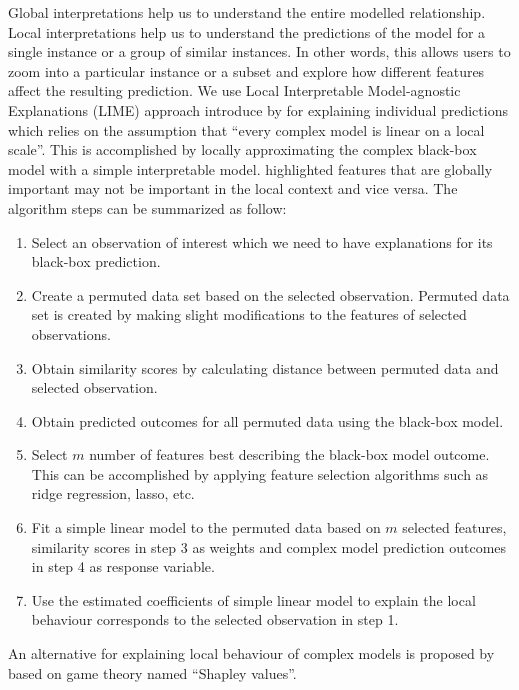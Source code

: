 \documentclass[11pt,a4paper,]{article}
\providecommand{\tightlist}{%
  \setlength{\itemsep}{0pt}\setlength{\parskip}{0pt}}
\begin{document}
Global interpretations help us to understand the entire modelled relationship. Local interpretations help us to understand the predictions of the model for a single instance or a group of similar instances. In other words, this allows users to zoom into a particular instance or a subset and explore how different features affect the resulting prediction. We use Local Interpretable Model-agnostic Explanations (LIME) approach introduce by \textcite{ribeiro2016should} for explaining individual predictions which relies on the assumption that ``every complex model is linear on a local scale''. This is accomplished by locally approximating the complex black-box model with a simple interpretable model. \textcite{ribeiro2016should} highlighted features that are globally important may not be important in the local context and vice versa. The algorithm steps can be summarized as follow:

\begin{enumerate}
\def\labelenumi{\arabic{enumi}.}
\tightlist
\item
  Select an observation of interest which we need to have explanations for its black-box prediction.
\item
  Create a permuted data set based on the selected observation. Permuted data set is created by making slight modifications to the features of selected observations.
\item
  Obtain similarity scores by calculating distance between permuted data and selected observation.
\item
  Obtain predicted outcomes for all permuted data using the black-box model.
\item
  Select \(m\) number of features best describing the black-box model outcome. This can be accomplished by applying feature selection algorithms such as ridge regression, lasso, etc.
\item
  Fit a simple linear model to the permuted data based on \(m\) selected features, similarity scores in step 3 as weights and complex model prediction outcomes in step 4 as response variable.
\item
  Use the estimated coefficients of simple linear model to explain the local behaviour corresponds to the selected observation in step 1.
\end{enumerate}

An alternative for explaining local behaviour of complex models is proposed by \textcite{lundberg2017unified} based on game theory named ``Shapley values''.
\end{document}
